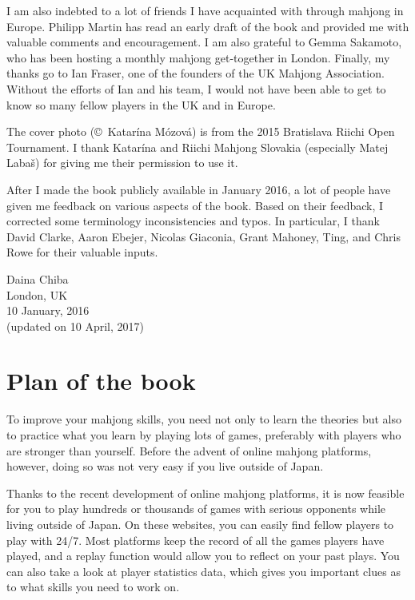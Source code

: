 \bigskip
I am also indebted to a lot of friends I have acquainted with through mahjong in Europe. Philipp Martin has read an early draft of the book and provided me with valuable comments and encouragement. I am also grateful to Gemma Sakamoto, who has been hosting a monthly mahjong get-together in London.
Finally, my thanks go to Ian Fraser, one of the founders of the UK Mahjong Association.
Without the efforts of Ian and his team, I would not have been able to get to know so many fellow players in the UK and in Europe.

\bigskip
The cover photo (\copyright~Katar\'{i}na M\'{o}zov\'{a}) is from the 2015 Bratislava Riichi Open Tournament. I thank Katar\'{i}na and Riichi Mahjong Slovakia (especially Matej Laba\v{s}) for giving me their permission to use it.

\bigskip
After I made the book publicly available in January 2016, a lot of people have given me feedback on various aspects of the book. Based on their feedback, I corrected some terminology inconsistencies and typos. In particular, I thank David Clarke, Aaron Ebejer, Nicolas Giaconia, Grant Mahoney, Ting, and Chris Rowe for their valuable inputs.

\vfill

\hfill Daina Chiba\\
\hfill London, UK\\
\hfill 10 January, 2016\\
\hfill (updated on 10 April, 2017)

\section*{Plan of the book}

To improve your mahjong skills, you need not only to learn the theories but also to practice what you learn by playing lots of games, preferably with players who are stronger than yourself. Before the advent of online mahjong platforms, however, doing so was not very easy if you live outside of Japan.

\bigskip
Thanks to the recent development of online mahjong platforms, it is now feasible for you to play hundreds or thousands of games with serious opponents while living outside of Japan. On these websites, you can easily find fellow players to play with 24/7. Most platforms keep the record of all the games players have played, and a replay function would allow you to reflect on your past plays. You can also take a look at player statistics data, which gives you important clues as to what skills you need to work on.

